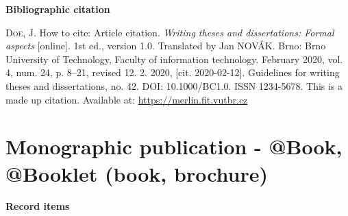 \bigskip

\noindent \textbf{Bibliographic citation}

\medskip

\noindent \textsc{Doe}, J. How to cite: Article citation. \textit{Writing theses and dissertations: Formal aspects} [online]. 1st ed., version 1.0. Translated by Jan NOVÁK. Brno: Brno University of Technology, Faculty of information technology. February 2020, vol. 4, num. 24, p. 8–21, revised 12. 2. 2020, [cit. 2020-02-12]. Guidelines for writing theses and dissertations, no. 42. DOI: 10.1000/BC1.0. ISSN 1234-5678. This is a made up citation. Available at: \url{https://merlin.fit.vutbr.cz}

\newpage
\section*{Monographic publication - @Book, @Booklet (book, brochure)}
\label{pr-monografie}
\noindent \textbf{Record items}

\medskip

